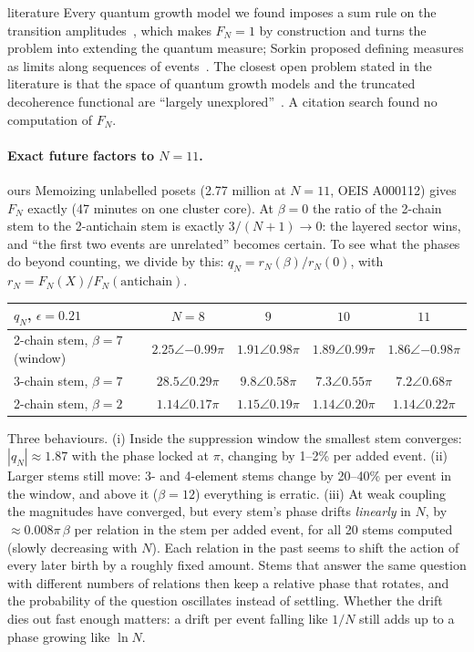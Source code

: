 \documentclass[11pt,a4paper]{article}
\newcommand{\tagbox}[2]{\textsf{\scriptsize\colorbox{#1!12}{\textcolor{#1!70!black}{#2}}}}
\newcommand{\lit}{\tagbox{blue}{literature}}
\newcommand{\ours}{\tagbox{orange}{ours}}
\begin{document}
\lit{} Every quantum growth model we found imposes a sum rule on the transition amplitudes~\cite{DJS10,SuryaZalel20,SrivastavaSurya26}, which makes $F_N=1$ by construction and turns the problem into extending the quantum measure; Sorkin proposed defining measures as limits along sequences of events~\cite{Sorkin11}. The closest open problem stated in the literature is that the space of quantum growth models and the truncated decoherence functional are ``largely unexplored''~\cite[§6.4]{Surya19}. A citation search found no computation of $F_N$.

\paragraph{Exact future factors to $N=11$.} \ours{} Memoizing unlabelled posets (2.77 million at $N=11$, OEIS A000112) gives $F_N$ exactly (47 minutes on one cluster core). At $\beta=0$ the ratio of the 2-chain stem to the 2-antichain stem is exactly $3/(N+1)\to0$: the layered sector wins, and ``the first two events are unrelated'' becomes certain. To see what the phases do beyond counting, we divide by this: $q_N=r_N(\beta)/r_N(0)$, with $r_N=F_N(X)/F_N(\text{antichain})$.
\begin{center}\small
\begin{tabular}{@{}lcccc@{}}
\toprule
$q_N$, $\epsilon=0.21$ & $N=8$ & $9$ & $10$ & $11$\\
\midrule
2-chain stem, $\beta=7$ (window) & $2.25\angle{-0.99\pi}$ & $1.91\angle0.98\pi$ & $1.89\angle0.99\pi$ & $1.86\angle{-0.98\pi}$\\
3-chain stem, $\beta=7$ & $28.5\angle0.29\pi$ & $9.8\angle0.58\pi$ & $7.3\angle0.55\pi$ & $7.2\angle0.68\pi$\\
2-chain stem, $\beta=2$ & $1.14\angle0.17\pi$ & $1.15\angle0.19\pi$ & $1.14\angle0.20\pi$ & $1.14\angle0.22\pi$\\
\bottomrule
\end{tabular}
\end{center}
Three behaviours. (i) Inside the suppression window the smallest stem converges: $|q_N|\approx1.87$ with the phase locked at $\pi$, changing by 1--2\% per added event. (ii) Larger stems still move: 3- and 4-element stems change by 20--40\% per event in the window, and above it ($\beta=12$) everything is erratic. (iii) At weak coupling the magnitudes have converged, but every stem's phase drifts \emph{linearly} in $N$, by $\approx0.008\pi\,\beta$ per relation in the stem per added event, for all 20 stems computed (slowly decreasing with $N$). Each relation in the past seems to shift the action of every later birth by a roughly fixed amount. Stems that answer the same question with different numbers of relations then keep a relative phase that rotates, and the probability of the question oscillates instead of settling. Whether the drift dies out fast enough matters: a drift per event falling like $1/N$ still adds up to a phase growing like $\ln N$.
\end{document}
